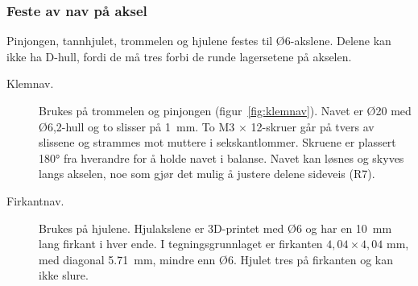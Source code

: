 \subsubsection{Feste av nav på aksel}
\label{sec:nv-serien}
Pinjongen, tannhjulet, trommelen og hjulene festes til Ø6-akslene. Delene kan ikke ha D-hull, fordi de må tres forbi de runde lagersetene på akselen.

\begin{description}
    \item[Klemnav.] Brukes på trommelen og pinjongen (figur~\ref{fig:klemnav}). Navet er Ø20 med Ø6,2-hull og to slisser på \SI{1}{mm}. To M3 × 12-skruer går på tvers av slissene og strammes mot muttere i sekskantlommer. Skruene er plassert 180° fra hverandre for å holde navet i balanse. Navet kan løsnes og skyves langs akselen, noe som gjør det mulig å justere delene sideveis (R7).
    \item[Firkantnav.] Brukes på hjulene. Hjulakslene er 3D-printet med Ø6 og har en \SI{10}{mm} lang firkant i hver ende. I tegningsgrunnlaget er firkanten $4{,}04 \times 4{,}04$ mm, med diagonal \SI{5,71}{mm}, mindre enn Ø6. Hjulet tres på firkanten og kan ikke slure.
\end{description}

